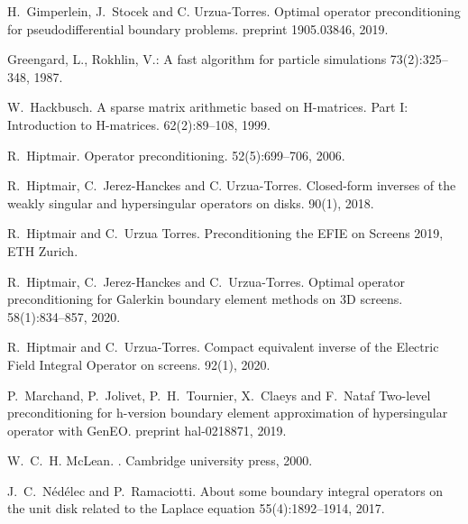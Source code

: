 \documentclass[]{article}
\begin{document}
\begin{small}
\begin{thebibliography}{0}
		H.~Gimperlein, J.~Stocek and C. Urzua-Torres.
		\newblock Optimal operator preconditioning for pseudodifferential boundary problems.
		 preprint 1905.03846, 2019.
		
		Greengard, L., Rokhlin, V.:
		\newblock A fast algorithm for particle simulations
		 73(2):325--348, 1987.
		
		W.~Hackbusch.
		\newblock A sparse matrix arithmetic based on H-matrices. Part I: Introduction to H-matrices.
		 62(2):89--108, 1999.
		
		R.~Hiptmair.
		\newblock Operator preconditioning.
		 52(5):699--706, 2006.
		
		
		R.~Hiptmair, C.~Jerez-Hanckes and C. Urzua-Torres.
		\newblock Closed-form inverses of the weakly singular and hypersingular operators on disks.
		 90(1), 2018.
		
		
		R.~Hiptmair and C.~Urzua Torres.
		Preconditioning the EFIE on Screens
		 2019, ETH Zurich.
		
		
		R.~Hiptmair, C.~Jerez-Hanckes and C.~Urzua-Torres.
		\newblock Optimal operator preconditioning for Galerkin boundary element methods on 3D screens. 
		 58(1):834--857, 2020.
		
		R.~Hiptmair and C.~Urzua-Torres.
		\newblock Compact equivalent inverse of the {E}lectric {F}ield
		{I}ntegral {O}perator on screens.
		 92(1), 2020.

		P.~Marchand, P.~Jolivet, P.~H.~Tournier, X.~Claeys and F.~Nataf
		\newblock Two-level preconditioning for h-version boundary element approximation of hypersingular operator with GenEO.
		 preprint hal-0218871, 2019.

		
		W.~C.~H. McLean.
		.
		\newblock Cambridge university press, 2000.
		
		J.~C.~Nédélec and P.~Ramaciotti.
		\newblock About some boundary integral operators on the unit disk related to the Laplace equation
		 55(4):1892--1914, 2017.
		

\end{thebibliography}
\end{small}
\end{document}
